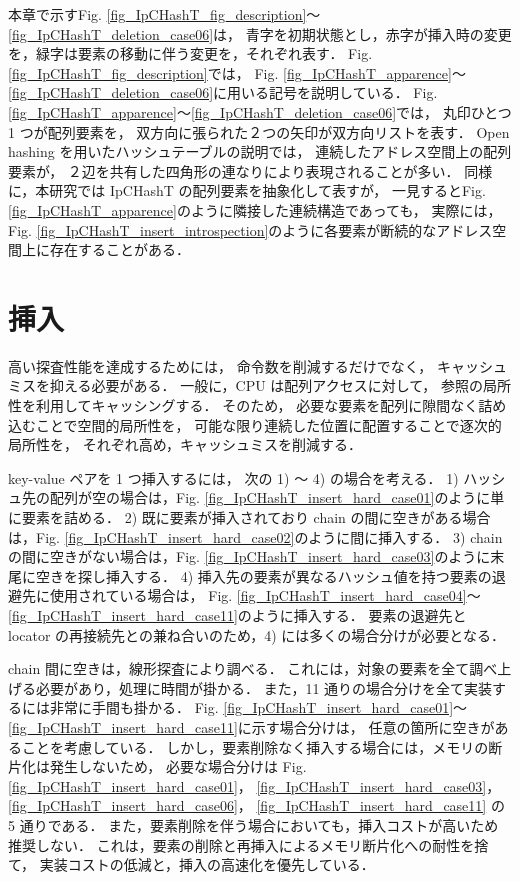 本章で示すFig. \ref{fig_IpCHashT_fig_description}〜\ref{fig_IpCHashT_deletion_case06}は，
青字を初期状態とし，赤字が挿入時の変更を，緑字は要素の移動に伴う変更を，それぞれ表す．
Fig. \ref{fig_IpCHashT_fig_description}では，
Fig. \ref{fig_IpCHashT_apparence}〜\ref{fig_IpCHashT_deletion_case06}に用いる記号を説明している．
Fig. \ref{fig_IpCHashT_apparence}〜\ref{fig_IpCHashT_deletion_case06}では，
丸印ひとつ 1 つが配列要素を，
双方向に張られた２つの矢印が双方向リストを表す．
Open hashing を用いたハッシュテーブルの説明では，
連続したアドレス空間上の配列要素が，
２辺を共有した四角形の連なりにより表現されることが多い．
同様に，本研究では IpCHashT の配列要素を抽象化して表すが，
一見するとFig. \ref{fig_IpCHashT_apparence}のように隣接した連続構造であっても，
実際には，Fig. \ref{fig_IpCHashT_insert_introspection}のように各要素が断続的なアドレス空間上に存在することがある．

\leavevmode \newline
\section{挿入}

高い探査性能を達成するためには，
命令数を削減するだけでなく，
キャッシュミスを抑える必要がある．
一般に，CPU は配列アクセスに対して，
参照の局所性を利用してキャッシングする．
そのため，
必要な要素を配列に隙間なく詰め込むことで空間的局所性を，
可能な限り連続した位置に配置することで逐次的局所性を，
それぞれ高め，キャッシュミスを削減する．

key-value ペアを 1 つ挿入するには，
次の 1) 〜 4) の場合を考える．
1) ハッシュ先の配列が空の場合は，Fig. \ref{fig_IpCHashT_insert_hard_case01}のように単に要素を詰める．
2) 既に要素が挿入されており chain の間に空きがある場合は，Fig. \ref{fig_IpCHashT_insert_hard_case02}のように間に挿入する．
3) chain の間に空きがない場合は，Fig. \ref{fig_IpCHashT_insert_hard_case03}のように末尾に空きを探し挿入する．
4) 挿入先の要素が異なるハッシュ値を持つ要素の退避先に使用されている場合は，
Fig. \ref{fig_IpCHashT_insert_hard_case04}〜\ref{fig_IpCHashT_insert_hard_case11}のように挿入する．
要素の退避先と locator の再接続先との兼ね合いのため，4) には多くの場合分けが必要となる．

chain 間に空きは，線形探査により調べる．
これには，対象の要素を全て調べ上げる必要があり，処理に時間が掛かる．
また，11 通りの場合分けを全て実装するには非常に手間も掛かる．
Fig. \ref{fig_IpCHashT_insert_hard_case01}〜\ref{fig_IpCHashT_insert_hard_case11}に示す場合分けは，
任意の箇所に空きがあることを考慮している．
しかし，要素削除なく挿入する場合には，メモリの断片化は発生しないため，
必要な場合分けは
Fig. \ref{fig_IpCHashT_insert_hard_case01}，
\ref{fig_IpCHashT_insert_hard_case03}，
\ref{fig_IpCHashT_insert_hard_case06}，
\ref{fig_IpCHashT_insert_hard_case11}
の 5 通りである．
また，要素削除を伴う場合においても，挿入コストが高いため推奨しない．
これは，要素の削除と再挿入によるメモリ断片化への耐性を捨て，
実装コストの低減と，挿入の高速化を優先している．

